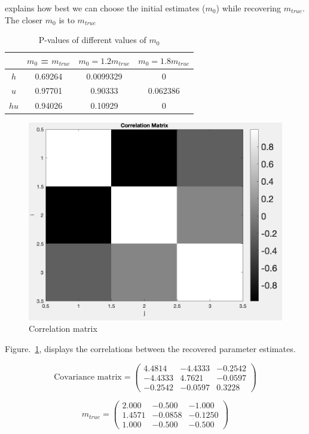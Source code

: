 \documentclass[12pt,a4paper]{article}
\begin{document}
explains how best we can choose the initial estimates ($m_0$) while recovering $m_{true}$. The closer $m_0$ is to $m_{true}$ 

	
			\begin{table}[H]
					\begin{center}
				\begin{tabular}{|c|c|c|c|}
					\hline
					& $m_0$ = $m_{true}$ & $m_0 = 1.2m_{true}$ & $m_0 = 1.8m_{true}$ \\
					\hline
					$h$ & 0.69264 & 0.0099329  &0 \\
					\hline
					$u$ &  0.97701& 0.90333 & 0.062386 \\
					\hline
					$hu$ & 0.94026 & 0.10929  & 0 \\
					\hline
				\end{tabular}
				\caption{ P-values of different values of $m_0$  }
			\end{center}
			\end{table}




	\begin{figure}[H]
	\centering
	\includegraphics[width=0.5\linewidth]{correl}
	\caption{Correlation matrix }
	\label{cor}
\end{figure}
Figure.~\ref{cor}, displays the correlations between the recovered parameter estimates. 

\begin{equation}
	\text{Covariance matrix} = \begin{pmatrix}
		4.4814 & -4.4333	 & -0.2542 \\
		-4.4333 & 4.7621 & -0.0597 \\
		-0.2542 & -0.0597 & 0.3228
	\end{pmatrix}
\end{equation}

\begin{equation}
m_{true} = \begin{pmatrix}
		2.000& -0.500	 & -1.000 \\
		1.4571& -0.0858 & -0.1250 \\
		1.000 & -0.500 & -0.500
	\end{pmatrix}
\end{equation}
\end{document}
